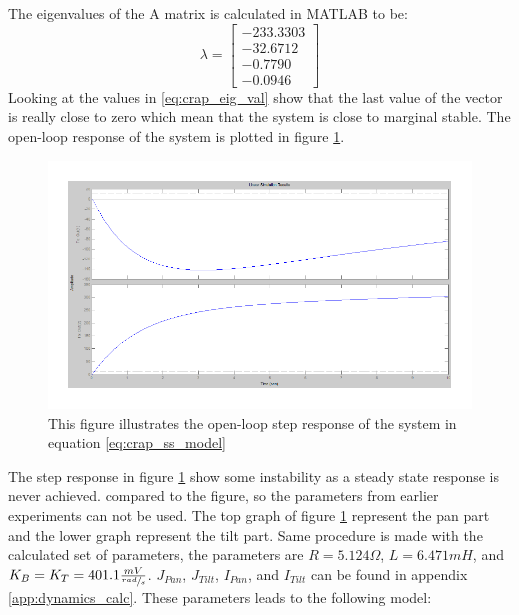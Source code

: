 The eigenvalues of the A matrix is calculated in MATLAB to be:
\begin{equation}
 \lambda =
 \begin{bmatrix}
   - 233.3303\\
   - 32.6712\\
   - 0.7790\\
   - 0.0946
 \end{bmatrix}\label{eq:crap_eig_val}
\end{equation}
Looking at the values in \ref{eq:crap_eig_val} show that the last value of the vector is really close to zero which mean that the system is close to marginal stable. The open-loop response of the system is plotted in figure \ref{fig:crap_step}.
\begin{figure}[htb]
	\begin{center}
	\includegraphics[scale=1,trim=0 0 0 0]{graphics/CrapSim.pdf} %
	\caption{This figure illustrates the open-loop step response of the system in equation \ref{eq:crap_ss_model}}
	\label{fig:crap_step}			%
	\end{center}
\end{figure}
The step response in figure \ref{fig:crap_step} show some instability as a steady state response is never achieved.  compared to the figure, so the parameters from earlier experiments can not be used. The top graph of figure \ref{fig:crap_step} represent the pan part and the lower graph represent the tilt part. Same procedure is made with the calculated set of parameters, the parameters are $R = 5.124\Omega$, $L = 6.471mH$, and $K_B = K_T = 401.1 \frac{mV}{\sfrac{rad}{s}}$. $J_{Pan}$, $J_{Tilt}$, $I_{Pan}$, and $I_{Tilt}$ can be found in appendix \ref{app:dynamics_calc}.
These parameters leads to the following model:

